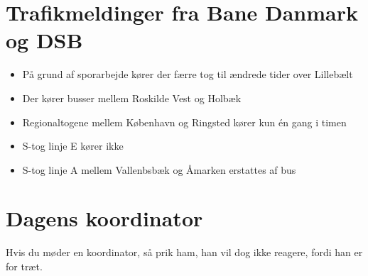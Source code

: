 

\begin{minipage}[b]{0.95\linewidth}
\begin{minipage}[t]{0.47\textwidth}
\vspace{1mm}
\section*{Trafikmeldinger fra Bane Danmark og DSB}
\begin{itemize}
\item På grund af sporarbejde kører der færre tog til ændrede tider over Lillebælt
\item Der kører busser mellem Roskilde Vest og Holbæk
\item Regionaltogene mellem København og Ringsted kører kun én gang i timen
\item S-tog linje E kører ikke
\item S-tog linje A mellem Vallenbsbæk og Åmarken erstattes af bus
\end{itemize}

\section*{Dagens koordinator}
Hvis du møder en koordinator, så prik ham, han vil dog ikke reagere, fordi han er for træt.


\end{minipage}
\end{minipage}
